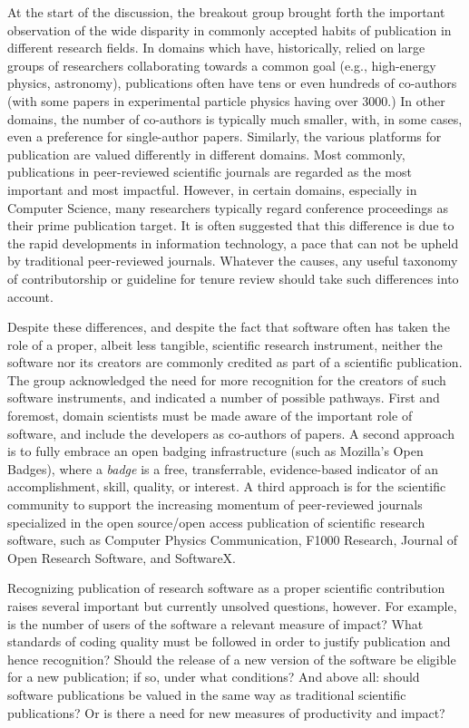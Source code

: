 \documentclass[11pt, oneside]{amsart}
\begin{document}
At the start of the discussion, the breakout group brought forth the important
observation of the wide disparity in commonly accepted habits of publication in
different research fields. In domains which have, historically, relied on large
groups of researchers collaborating towards a common goal (e.g., high-energy
physics, astronomy), publications often have tens or even hundreds of co-authors
(with some papers in experimental particle physics having over 3000.) In other
domains, the number of co-authors is typically much smaller, with, in some
cases, even a preference for single-author papers. Similarly, the various
platforms for publication are valued differently in different domains. Most
commonly, publications in peer-reviewed scientific journals are regarded as the
most important and most impactful. However, in certain domains, especially in
Computer Science, many researchers typically regard conference proceedings as
their prime publication target. It is often suggested that this difference is
due to the rapid developments in information technology, a pace that can not be upheld by
traditional peer-reviewed journals. Whatever the causes, any useful taxonomy of
contributorship or guideline for tenure review should take such differences into
account.

Despite these differences, and despite the fact that software often has taken
the role of a proper, albeit less tangible, scientific research instrument,
neither the software nor its creators are commonly credited as part of a
scientific publication. The group acknowledged the need for more recognition for
the creators of such software instruments, and indicated a number of possible
pathways. First and foremost, domain scientists must be made aware of the
important role of software, and include the developers as co-authors of papers.
A second approach is to fully embrace an open badging infrastructure (such as
Mozilla's Open Badges), where a {\em badge} is a free, transferrable,
evidence-based indicator of an accomplishment, skill, quality, or interest. A
third approach is for the scientific community to support the increasing
momentum of peer-reviewed journals specialized in the open source/open access
publication of scientific research software, such as Computer Physics
Communication, F1000 Research, Journal of Open Research Software, and SoftwareX.

Recognizing publication of research software as a proper scientific contribution
raises several important but currently unsolved questions, however. For example,
is the number of users of the software a relevant measure of impact? What
standards of coding quality must be followed in order to justify publication and
hence recognition? Should the release of a new version of the software be
eligible for a new publication; if so, under what conditions? And above all:
should software publications be valued in the same way as traditional scientific
publications? Or is there a need for new measures of productivity and impact?
\end{document}
